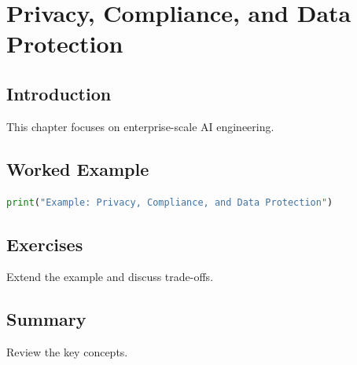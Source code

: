 \chapter{Privacy, Compliance, and Data Protection}
\label{chap:vol10-13}



\section{Introduction}
This chapter focuses on enterprise-scale AI engineering.

\section{Worked Example}
\begin{lstlisting}[language=Python]
print("Example: Privacy, Compliance, and Data Protection")
\end{lstlisting}

\section{Exercises}
\begin{exercise}
Extend the example and discuss trade-offs.
\end{exercise}

\section{Summary}
Review the key concepts.
